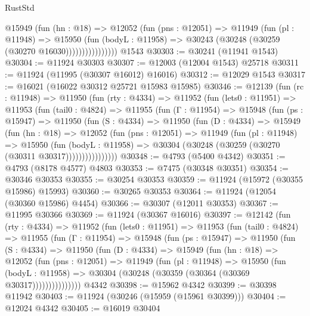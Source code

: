 \begin{lexlean}{RustStd}
\begin{coremodule}
                    @15949
                      (fun (hn : @18) =>
                      @12052
                        (fun (pns : @12051) =>
                        @11949
                          (fun (pl : @11948) =>
                          @15950
                            (fun (bodyL : @11958) =>
                            @30243 (@30248 (@30259 (@30270 @16030))))))))))))))))
    @1543
@30303 := @30241 (@11941 @1543)
@30304 := @11924 @30303
@30307 := @12003 (@12004 @1543) @25718
@30311 := @11924 (@11995 (@30307 @16012) @16016)
@30312 := @12029 @1543
@30317 := @16021 (@16022 @30312 @25721 @15983 @15985)
@30346 := @12139
    (fun (rc : @11948) =>
    @11950
      (fun (rty : @4334) =>
      @11952
        (fun (lets0 : @11951) =>
        @11953
          (fun (tail0 : @4824) =>
          @11955
            (fun (Γ : @11954) =>
            @15948
              (fun (ps : @15947) =>
              @11950
                (fun (S : @4334) =>
                @11950
                  (fun (D : @4334) =>
                  @15949
                    (fun (hn : @18) =>
                    @12052
                      (fun (pns : @12051) =>
                      @11949
                        (fun (pl : @11948) =>
                        @15950
                          (fun (bodyL : @11958) =>
                          @30304 (@30248 (@30259 (@30270 (@30311 @30317))))))))))))))))
@30348 := @4793 (@5400 @4342)
@30351 := @4793 (@8178 @4577) @4803
@30353 := @7475 (@30348 @30351)
@30354 := @30346 @30353
@30355 := @30254 @30353
@30359 := @11924 (@15972 (@30355 @15986) @15993)
@30360 := @30265 @30353
@30364 := @11924 (@12054 (@30360 @15986) @4454)
@30366 := @30307 (@12011 @30353)
@30367 := @11995 @30366
@30369 := @11924 (@30367 @16016)
@30397 := @12142
    (fun (rty : @4334) =>
    @11952
      (fun (lets0 : @11951) =>
      @11953
        (fun (tail0 : @4824) =>
        @11955
          (fun (Γ : @11954) =>
          @15948
            (fun (ps : @15947) =>
            @11950
              (fun (S : @4334) =>
              @11950
                (fun (D : @4334) =>
                @15949
                  (fun (hn : @18) =>
                  @12052
                    (fun (pns : @12051) =>
                    @11949
                      (fun (pl : @11948) =>
                      @15950
                        (fun (bodyL : @11958) =>
                        @30304 (@30248 (@30359 (@30364 (@30369 @30317)))))))))))))))
    @4342
@30398 := @15962 @4342
@30399 := @30398 @11942
@30403 := @11924 (@30246 (@15959 (@15961 @30399)))
@30404 := @12024 @4342
@30405 := @16019 @30404

\end{coremodule}
\end{lexlean}
